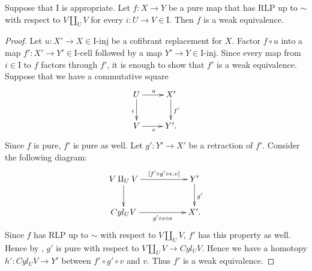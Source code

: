 \documentclass{amsart}
\theoremstyle{definition}
\newcommand{\I}{\mathrm{I}}
\newcommand{\class}[2]{#1\text{-}\mathrm{#2}}
\newcommand{\Iinj}[1][\I]{\class{#1}{inj}}
\newcommand{\Icell}[1][\I]{\class{#1}{cell}}
\begin{document}
\begin{prop}[pure-we]
Suppose that $\I$ is appropriate.
Let $f : X \to Y$ be a pure map that has RLP up to $\sim$ with respect to $V \amalg_U V$ for every $i : U \to V \in \I$.
Then $f$ is a weak equivalence.
\end{prop}
\begin{proof}
Let $u : X' \to X \in \Iinj$ be a cofibrant replacement for $X$.
Factor $f \circ u$ into a map $f' : X' \to Y' \in \Icell$ followed by a map $Y' \to Y \in \Iinj$.
Since every map from $i \in \I$ to $f$ factors through $f'$, it is enough to show that $f'$ is a weak equivalence.
Suppose that we have a commutative square
\[ \xymatrix{ U \ar[r]^u \ar[d]_i & X' \ar[d]^{f'} \\
              V \ar[r]_v          & Y'.
            } \]
Since $f$ is pure, $f'$ is pure as well.
Let $g' : Y' \to X'$ be a retraction of $f'$.
Consider the following diagram:
\[ \xymatrix{ V \amalg_U V \ar[rr]^-{[f' \circ g' \circ v, v]} \ar[d] & & Y' \ar[d]^{g'} \\
              Cyl_U V      \ar[rr]_-{g' \circ v \circ s}              & & X'.
            } \]
Since $f$ has RLP up to $\sim$ with respect to $V \amalg_U V$, $f'$ has this property as well.
Hence by , $g'$ is pure with respect to $V \amalg_U V \to Cyl_U V$.
Hence we have a homotopy $h' : Cyl_U V \to Y'$ between $f' \circ g' \circ v$ and $v$.
Thus $f'$ is a weak equivalence.
\end{proof}
\end{document}
